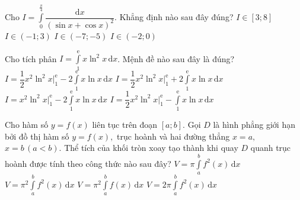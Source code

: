 \begin{ex}%
	Cho $\displaystyle I=\int\limits_{0}^{\frac{\pi}{4}} \dfrac{\mathrm{d}x}{\left (\sin x +\cos x\right )^2}$. Khẳng định nào sau đây đúng?
	\choice
	{$I \in [3;8]$}
	{\True $I \in (-1;3)$}
	{$I \in (-7;-5)$}
	{$I \in (-2;0)$}
\end{ex}


\begin{ex}%
	Cho tích phân $I=\displaystyle\int\limits_1^{\mathrm{e}}{x\ln ^2x \mathrm{\,d}x}$. Mệnh đề nào sau đây là đúng?
	\choice
	{$I=\dfrac{1}{2} x^2\ln ^2x\bigg|_1^{\mathrm{e}}-2\displaystyle\int\limits_1^{\mathrm{e}}{x\ln x\mathrm{\,d}x}$}
	{$I=\dfrac{1}{2} x^2\ln ^2x\bigg|_1^{\mathrm{e}}+2\displaystyle\int\limits_1^{\mathrm{e}}{x\ln x\mathrm{\,d}x}$}
	{$I=x^2\ln ^2x\bigg|_1^{\mathrm{e}}-2\displaystyle\int\limits_1^{\mathrm{e}}{x\ln x\mathrm{\,d}x}$}
	{\True $I=\dfrac{1}{2} x^2\ln ^2x\bigg|_1^{\mathrm{e}}-\displaystyle\int\limits_1^{\mathrm{e}}{x\ln x\mathrm{\,d}x}$}
\end{ex}

\begin{ex}%
	Cho hàm số $y=f(x)$ liên tục trên đoạn $[a;b].$ Gọi $D$ là hình phẳng giới hạn bởi đồ thị hàm số $y=f(x),$ trục hoành và hai đường thẳng $x=a,$ $x=b\, (a<b).$ Thể tích của khối tròn xoay tạo thành khi quay $D$ quanh trục hoành được tính theo công thức nào sau đây?
	\choice
	{\True $V=\pi\displaystyle\int\limits_{a}^{b}f^2(x)\mathrm{\,d}x$}
	{$V=\pi^2\displaystyle\int\limits_{a}^{b}f^2(x)\mathrm{\,d}x$}
	{$V=\pi^2\displaystyle\int\limits_{a}^{b}f(x)\mathrm{\,d}x$}
	{$V=2\pi\displaystyle\int\limits_{a}^{b}f^2(x)\mathrm{\,d}x$}
\end{ex}

